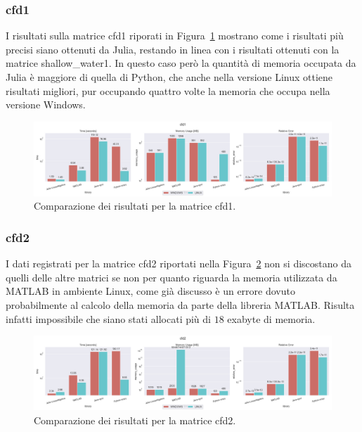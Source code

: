 \documentclass[a4paper, 12pt]{article}
\begin{document}
\subsubsection{cfd1}
I risultati sulla matrice cfd1 riporati in Figura~\ref{fig:cfd1} mostrano come i
risultati più precisi siano ottenuti da Julia, restando in linea con i risultati
ottenuti con la matrice shallow\_water1. In questo caso però la quantità di
memoria occupata da Julia è maggiore di quella di Python, che anche nella
versione Linux ottiene risultati migliori, pur occupando quattro volte la
memoria che occupa nella versione Windows.
\begin{figure}[ht]
\includegraphics[width=\textwidth]{cfd1}
\caption{Comparazione dei risultati per la matrice cfd1.}
\label{fig:cfd1}
\end{figure}
\subsubsection{cfd2}
I dati registrati per la matrice cfd2 riportati nella Figura~\ref{fig:cfd2} non
si discostano da quelli delle altre matrici se non per quanto riguarda la
memoria utilizzata da MATLAB in ambiente Linux, come già discusso è un errore
dovuto probabilmente al calcolo della memoria da parte della libreria MATLAB.
Risulta infatti impossibile che siano stati allocati più di $18$ exabyte di
memoria.
\begin{figure}[ht]
\includegraphics[width=\textwidth]{cfd2}
\caption{Comparazione dei risultati per la matrice cfd2.}
\label{fig:cfd2}
\end{figure}
\end{document}
